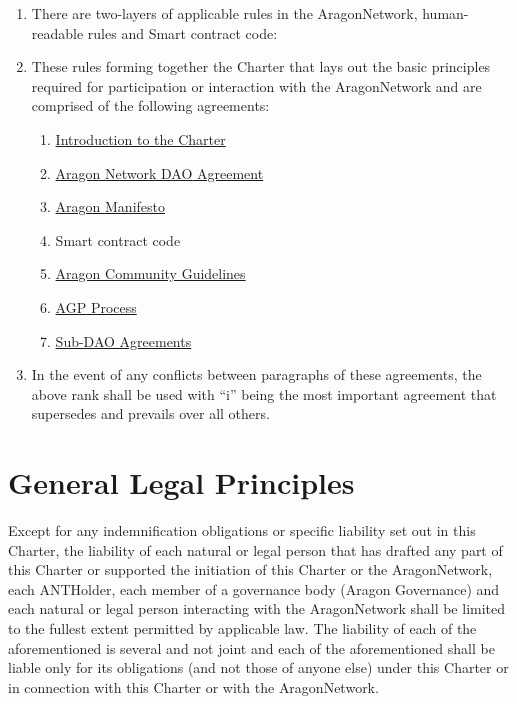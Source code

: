 \begin{enumerate}
	\item There are two-layers of applicable rules in the \gls{AragonNetwork}, human-readable rules and Smart contract code:
	\item These rules forming together the Charter that lays out the basic principles required for participation or interaction with the \gls{AragonNetwork} and are comprised of the following agreements:
	\begin{enumerate}
		\item \hyperref[chap:Introduction]{Introduction to the Charter}
		\item \hyperref[chap:ANDAOAgreement]{Aragon Network \ac{DAO} Agreement}
		\item \hyperref[chap:AragonManifesto]{Aragon Manifesto}
		\item Smart contract code
		\item \hyperref[chap:CommunityGuidelines]{Aragon Community Guidelines}
		\item \hyperref[chap:AGPProcess]{\ac{AGP} Process}
		\item \hyperref[chap:SubDAOAgreements]{Sub-DAO Agreements}
	\end{enumerate}
	\item In the event of any conflicts between paragraphs of these agreements, the above
	rank shall be used with “i” being the most important agreement that supersedes and prevails over all others.
\end{enumerate}


\section{General Legal Principles}

Except for any indemnification obligations or specific liability set out in this Charter, the liability of each natural or legal person that has drafted any part of this Charter or supported the initiation of this Charter or the \gls{AragonNetwork}, each \gls{ANTHolder}, each member of a governance body (Aragon Governance) and each natural or legal person interacting with the \gls{AragonNetwork} shall be limited to the fullest extent permitted by applicable law.
The liability of each of the aforementioned is several and not joint and each of the aforementioned shall be liable only for its obligations (and not those of anyone else) under this Charter or in connection with this Charter or with the \gls{AragonNetwork}.

